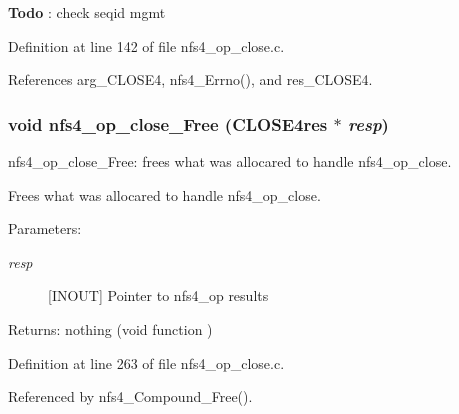 \begin{Desc}
\item[{\bf Todo}]: check seqid mgmt\end{Desc}


Definition at line 142 of file nfs4\_\-op\_\-close.c.

References arg\_\-CLOSE4, nfs4\_\-Errno(), and res\_\-CLOSE4.
\subsubsection{\setlength{\rightskip}{0pt plus 5cm}void nfs4\_\-op\_\-close\_\-Free (CLOSE4res $\ast$ {\em resp})}\label{nfs4__op__close_8c_a3}


nfs4\_\-op\_\-close\_\-Free: frees what was allocared to handle nfs4\_\-op\_\-close.

Frees what was allocared to handle nfs4\_\-op\_\-close.

\begin{Desc}
\item[Parameters:]
\begin{description}
\item[{\em resp}][INOUT] Pointer to nfs4\_\-op results\end{description}
\end{Desc}
\begin{Desc}
\item[Returns:]nothing (void function ) \end{Desc}


Definition at line 263 of file nfs4\_\-op\_\-close.c.

Referenced by nfs4\_\-Compound\_\-Free().
